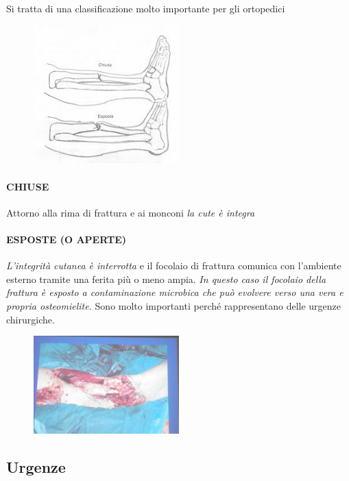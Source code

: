 Si tratta di una classificazione molto importante per gli ortopedici

\begin{figure}[!ht]
\centering
\includegraphics[width=0.5\textwidth]{002/image9.png}
\end{figure}

\paragraph{CHIUSE}
Attorno alla rima di frattura e ai monconi \emph{la cute è integra}
\paragraph{ESPOSTE (O APERTE)}
\emph{L'integrità cutanea è interrotta} e il focolaio di frattura comunica con l'ambiente esterno tramite una ferita più o meno ampia. \emph{In questo caso il focolaio della frattura è esposto a contaminazione microbica che può evolvere verso una vera e propria osteomielite.} Sono molto importanti perché rappresentano delle urgenze chirurgiche.

\begin{figure}[!ht]
\centering
\includegraphics[width=0.5\textwidth]{002/image10.png}
\end{figure}

\subsection{Urgenze}


